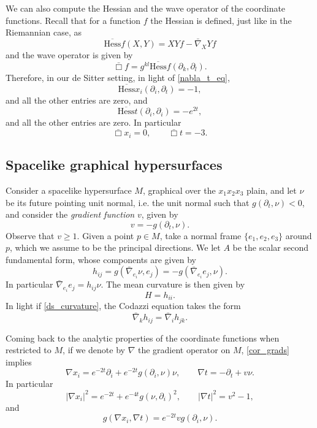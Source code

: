 \documentclass[leqno,11pt]{amsart}
\theoremstyle{definition}
\newcommand{\p}{\partial}
\begin{document}
We can also compute the Hessian and the wave operator of the coordinate functions. Recall that for a function $f$ the Hessian is defined, just like in the Riemannian case, as
\[
\overline{\mathrm{Hess}}f(X,Y)=XYf-\bar{\nabla}_XYf
\]
and the wave operator is given by
\[
\bar{\Box} f=g^{kl}\overline{\mathrm{Hess}}f(\p_k,\p_l).
\] 
Therefore, in our de Sitter setting, in light of \eqref{nabla_t_eq},
\begin{equation}\label{cor_hess1}
\overline{\mathrm{Hess}}x_i(\partial_{i},\partial_t)=-1,
\end{equation}
and all the other entries are zero, and 
\begin{equation}\label{cor_hess2}
\overline{\mathrm{Hess}}t(\partial_i,\partial_i)=-e^{2t},
\end{equation}
and all the other entries are zero. In particular
\begin{equation}\label{co-ordinate_wave}
\bar{\Box} x_i=0, \qquad \bar{\Box} t=-3.
\end{equation} 



\subsection*{Spacelike graphical hypersurfaces}
Consider a spacelike hypersurface $M$, graphical over the $x_1x_2x_3$ plain, and let $\nu$ be its future pointing unit normal, i.e. the unit normal such that $g(\p_t,\nu)<0$, and consider the \textit{gradient function} $v$, given by  
\begin{equation}
v=-g( \p_t,\nu).
\end{equation}
Observe that $v\geq 1$. Given a point $p\in M$, take a normal frame $\{e_1,e_2,e_3\}$ around $p$, which we assume to be the principal directions. We let $A$ be the scalar second fundamental form, whose components are given by 
\[
h_{ij}=g(\bar{\nabla}_{e_i}\nu,e_j)=-g(\bar{\nabla}_{e_i}e_j,\nu).
\] 
In particular $\bar{\nabla}_{e_i}e_j=h_{ij}\nu$. The mean curvature is then given by
\[
H=h_{ii}.
\]
In light if \eqref{ds_curvature}, the Codazzi equation takes the form 
\[
\bar{\nabla}_{k}h_{ij}=\bar{\nabla}_{i}h_{jk}.
\]

\bigskip

Coming back to the analytic properties of the coordinate functions when restricted to $M$, if we denote by $\nabla$ the gradient operator on $M$, \eqref{cor_grads} implies
\begin{equation}
\nabla x_i=e^{-2t}\partial_i+e^{-2t}g(\partial_i,\nu)\nu,\qquad\nabla t=-\p_t+v\nu.
\end{equation}
In particular
\begin{equation}\label{grad_sq}
|\nabla x_i|^2=e^{-2t}+e^{-4t}g(\nu ,\partial_i)^2,\qquad |\nabla t|^2=v^2-1,
\end{equation}
and 
\begin{equation}\label{cross_term}
g(\nabla x_i, \nabla t)= e^{-2t}vg(\p_i,\nu).
\end{equation}
\end{document}
